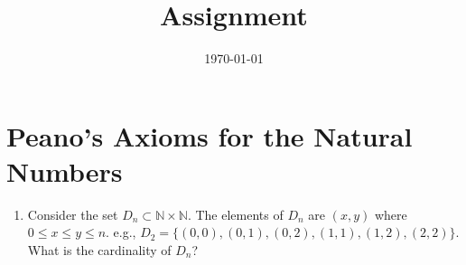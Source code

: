 \documentclass[12pt]{amsart}
\title{Assignment}
\date{\today}
\begin{document}
\maketitle
\part*{Peano's Axioms for the Natural Numbers}
\begin{enumerate}
\item Consider the set $D_n \subset \mathbb{N} \times \mathbb{N}$. The elements of $D_n$ are $(x,y)$ where $0 \leq x \leq y \leq n$. e.g., $D_2 =  \{ (0,0), (0,1), (0,2), (1,1), (1,2), (2,2)\}$. What is the cardinality of $D_n$?
\end{enumerate}
\end{document}
